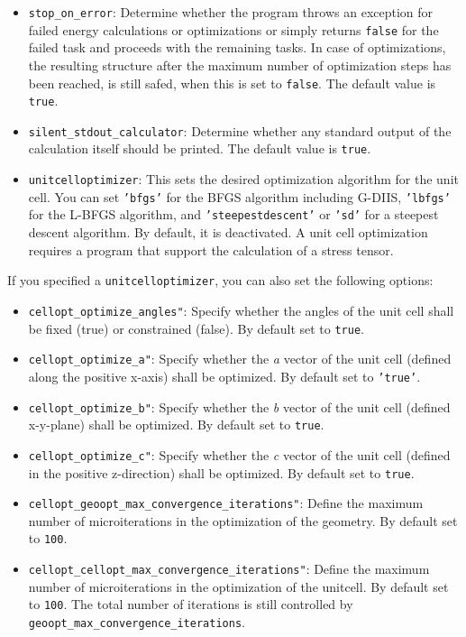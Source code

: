 \documentclass[]{tufte-book}
\begin{document}
\begin{itemize}
\item \texttt{stop\_on\_error}: Determine whether the program throws an exception for failed energy calculations or optimizations or simply returns \texttt{false} for the failed task and proceeds with the remaining tasks. In case of optimizations, the resulting structure after the maximum number of optimization steps has been reached, is still safed, when this is set to \texttt{false}. The default value is \texttt{true}.
\item \texttt{silent\_stdout\_calculator}: Determine whether any standard output of the calculation itself should be printed. The default value is \texttt{true}.
\item \texttt{unitcelloptimizer}: This sets the desired optimization algorithm for the unit cell. You can set \texttt{'bfgs'} 
for the BFGS algorithm including G-DIIS, \texttt{'lbfgs'} for the L-BFGS algorithm, and \texttt{'steepestdescent'} or \texttt{'sd'} 
for a steepest descent algorithm. By default, it is deactivated. A unit cell optimization requires a program that support the calculation
of a stress tensor.
\end{itemize}
If you specified a \texttt{unitcelloptimizer}, you can also set the following options:
\begin{itemize}
\item \texttt{cellopt\_optimize\_angles"}: Specify whether the angles of the unit cell shall be fixed (true) or constrained (false). By default set to \texttt{true}.
\item \texttt{cellopt\_optimize\_a"}: Specify whether the \textit{a} vector of the unit cell (defined along the positive x-axis) shall be optimized. By default set to \texttt{'true'}.
\item \texttt{cellopt\_optimize\_b"}: Specify whether the \textit{b} vector of the unit cell (defined x-y-plane) shall be optimized. By default set to \texttt{true}.
\item \texttt{cellopt\_optimize\_c"}: Specify whether the \textit{c} vector of the unit cell (defined in the positive z-direction) shall be optimized. By default set to \texttt{true}.
\item \texttt{cellopt\_geoopt\_max\_convergence\_iterations"}: Define the maximum number of microiterations in the optimization of the geometry. By default set to \texttt{100}.
\item \texttt{cellopt\_cellopt\_max\_convergence\_iterations"}: Define the maximum number of microiterations in the optimization of the unitcell. By default set to \texttt{100}.
The total number of iterations is still controlled by \texttt{geoopt\_max\_convergence\_iterations}.
\end{itemize}
\end{document}
